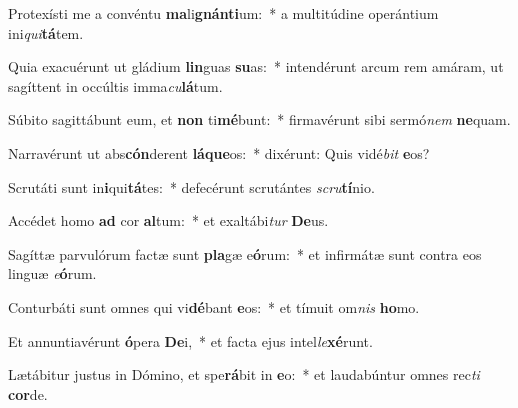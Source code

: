\item Protexísti me a convéntu \textbf{ma}li\textbf{gnán}\textbf{ti}um:~* a multitúdine operántium ini\textit{qui}\textbf{tá}tem.
\item Quia exacuérunt ut gládium \textbf{lin}guas \textbf{su}as:~* intendérunt arcum rem amáram, ut sagíttent in occúltis imma\textit{cu}\textbf{lá}tum.
\item Súbito sagittábunt eum, et \textbf{non} ti\textbf{mé}bunt:~* firmavérunt sibi sermó\textit{nem} \textbf{ne}quam.
\item Narravérunt ut abs\textbf{cón}derent \textbf{lá}\textbf{que}os:~* dixérunt: Quis vidé\textit{bit} \textbf{e}os?
\item Scrutáti sunt in\textbf{i}qui\textbf{tá}tes:~* defecérunt scrutántes \textit{scru}\textbf{tí}nio.
\item Accédet homo \textbf{ad} cor \textbf{al}tum:~* et exaltábi\textit{tur} \textbf{De}us.
\item Sagíttæ parvulórum factæ sunt \textbf{pla}gæ e\textbf{ó}rum:~* et infirmátæ sunt contra eos linguæ \textit{e}\textbf{ó}rum.
\item Conturbáti sunt omnes qui vi\textbf{dé}bant \textbf{e}os:~* et tímuit om\textit{nis} \textbf{ho}mo.
\item Et annuntiavérunt \textbf{ó}pera \textbf{De}i,~* et facta ejus intel\textit{le}\textbf{xé}runt.
\item Lætábitur justus in Dómino, et spe\textbf{rá}bit in \textbf{e}o:~* et laudabúntur omnes rec\textit{ti} \textbf{cor}de.
